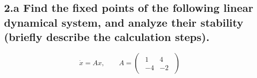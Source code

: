 \documentclass{cmc}
\begin{document}
\subsection*{2.a Find the fixed points of the following linear dynamical system,
  and analyze their stability (briefly describe the calculation steps).}

\begin{equation}
  \label{eq:system}
  \dot{x} = A x,
  \qquad
  A =
  \begin{pmatrix}
    \begin{array}{rr}
      1 & 4 \\
      -4 & -2
    \end{array}
  \end{pmatrix}
\end{equation}






\end{document}
